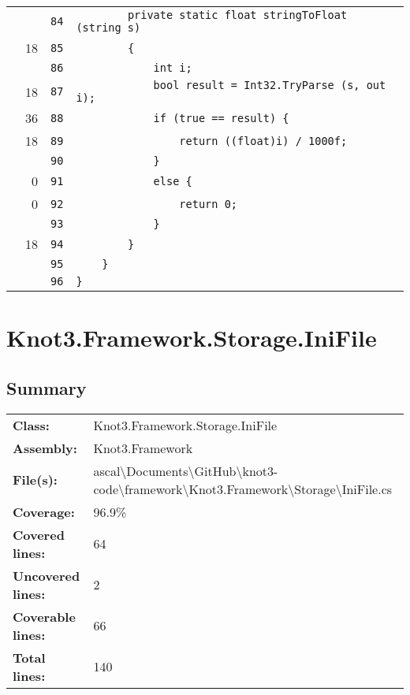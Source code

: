 \documentclass[a4paper,10pt]{article}
\begin{document}
\begin{longtable}[l]{lrrl}
\cellcolor{gray} &  & \verb~84~ & \verb~        private static float stringToFloat (string s)~\\
\cellcolor{green} & 18 & \verb~85~ & \verb~        {~\\
\cellcolor{gray} &  & \verb~86~ & \verb~            int i;~\\
\cellcolor{green} & 18 & \verb~87~ & \verb~            bool result = Int32.TryParse (s, out i);~\\
\cellcolor{green} & 36 & \verb~88~ & \verb~            if (true == result) {~\\
\cellcolor{green} & 18 & \verb~89~ & \verb~                return ((float)i) / 1000f;~\\
\cellcolor{gray} &  & \verb~90~ & \verb~            }~\\
\cellcolor{red} & 0 & \verb~91~ & \verb~            else {~\\
\cellcolor{red} & 0 & \verb~92~ & \verb~                return 0;~\\
\cellcolor{gray} &  & \verb~93~ & \verb~            }~\\
\cellcolor{green} & 18 & \verb~94~ & \verb~        }~\\
\cellcolor{gray} &  & \verb~95~ & \verb~    }~\\
\cellcolor{gray} &  & \verb~96~ & \verb~}~\\
\end{longtable}
\newpage
\section{Knot3.Framework.Storage.IniFile}
\subsection{Summary}
\begin{longtable}[l]{ll}
\textbf{Class:} & Knot3.Framework.Storage.IniFile\\
\textbf{Assembly:} & Knot3.Framework\\
\textbf{File(s):} & \begin{minipage}[t]{12cm}{ascal\textbackslash Documents\textbackslash GitHub\textbackslash knot3-code\textbackslash framework\textbackslash Knot3.Framework\textbackslash Storage\textbackslash IniFile.cs}\end{minipage} \\
\textbf{Coverage:} & 96.9\%\\
\textbf{Covered lines:} & 64\\
\textbf{Uncovered lines:} & 2\\
\textbf{Coverable lines:} & 66\\
\textbf{Total lines:} & 140\\
\end{longtable}
\end{document}
